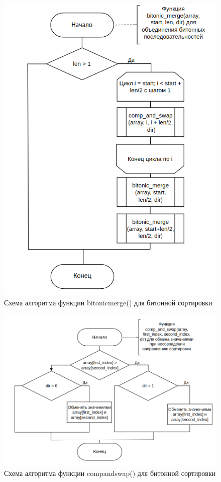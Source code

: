 \begin{figure}[h]
	\centering
	\includegraphics[height=0.8\textheight]{img/bitonic_3.png}
	\caption{Схема алгоритма функции bitonic\textunderscore merge() для битонной сортировки}
	\label{fig:bitonic_merge}
\end{figure}

\clearpage

\begin{figure}[h]
	\centering
	\includegraphics[height=0.4\textheight]{img/bitonic_4.png}
	\caption{Схема алгоритма функции comp\textunderscore and\textunderscore swap() для битонной сортировки}
	\label{fig:comp_and_swap}
\end{figure}

